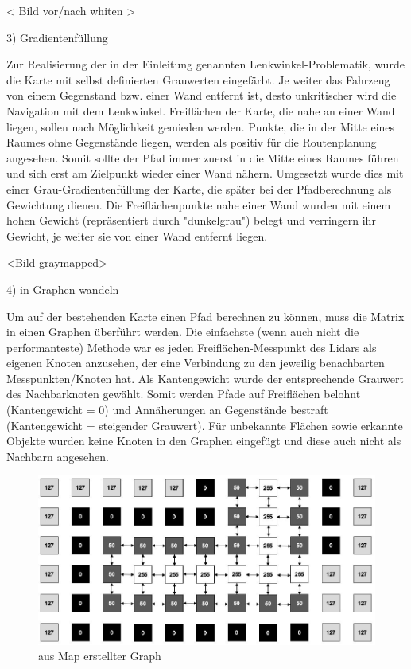 < Bild vor/nach whiten >


3) Gradientenfüllung

Zur Realisierung der in der Einleitung genannten Lenkwinkel-Problematik, wurde die Karte mit selbst definierten Grauwerten eingefärbt. Je weiter das Fahrzeug von einem Gegenstand bzw. einer Wand entfernt ist, desto unkritischer wird die Navigation mit dem Lenkwinkel. 
Freiflächen der Karte, die nahe an einer Wand liegen, sollen nach Möglichkeit gemieden werden. Punkte, die in der Mitte eines Raumes ohne Gegenstände liegen, werden als positiv für die Routenplanung angesehen. 
Somit sollte der Pfad immer zuerst in die Mitte eines Raumes führen und sich erst am Zielpunkt wieder einer Wand nähern. 
Umgesetzt wurde dies mit einer Grau-Gradientenfüllung der Karte, die später bei der Pfadberechnung als Gewichtung dienen. Die Freiflächenpunkte nahe einer Wand wurden mit einem hohen Gewicht (repräsentiert durch "dunkelgrau") belegt und verringern ihr Gewicht, je weiter sie von einer Wand entfernt liegen. 

<Bild graymapped>


4) in Graphen wandeln

Um auf der bestehenden Karte einen Pfad berechnen zu können, muss die Matrix in einen Graphen überführt werden. Die einfachste (wenn auch nicht die performanteste) Methode war es jeden Freiflächen-Messpunkt des Lidars als eigenen Knoten anzusehen, der eine Verbindung zu den jeweilig benachbarten Messpunkten/Knoten hat. Als Kantengewicht wurde der entsprechende Grauwert des Nachbarknoten gewählt. Somit werden Pfade auf Freiflächen belohnt (Kantengewicht = 0) und Annäherungen an Gegenstände bestraft (Kantengewicht = steigender Grauwert). 
Für unbekannte Flächen sowie erkannte Objekte wurden keine Knoten in den Graphen eingefügt und diese auch nicht als Nachbarn angesehen. 


\begin{figure}[h]
\begin{center}
\includegraphics[width=15cm]{images/chapter5/GraphKnoten.jpg}
\caption{aus Map erstellter Graph}
\label{Map_aus_Graph}
\end{center}
\end{figure}


